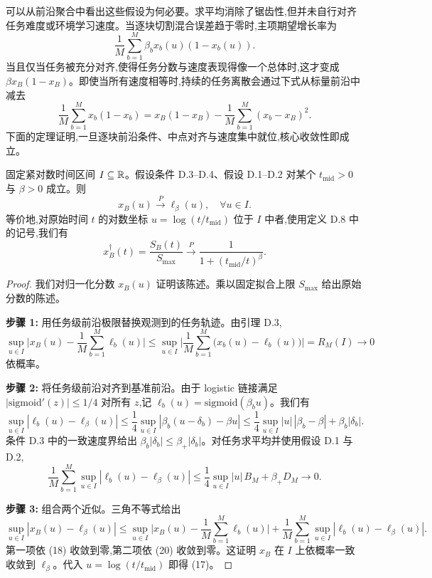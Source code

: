 可以从前沿聚合中看出这些假设为何必要。求平均消除了锯齿性,但并未自行对齐任务难度或环境学习速度。当逐块切割混合误差趋于零时,主项期望增长率为
\[
    \frac{1}{M} \sum_{b=1}^{M} \beta_{b} x_{b}(u)(1 - x_{b}(u)).
\]
当且仅当任务被充分对齐,使得任务分数与速度表现得像一个总体时,这才变成 $\beta x_{B} (1 - x_{B})$。即使当所有速度相等时,持续的任务离散会通过下式从标量前沿中减去
\[
    \frac{1}{M} \sum_{b=1}^{M} x_{b} (1 - x_{b}) = x_{B} (1 - x_{B}) - \frac{1}{M} \sum_{b=1}^{M} (x_{b} - x_{B})^{2}.
\]
下面的定理证明,一旦逐块前沿条件、中点对齐与速度集中就位,核心收敛性即成立。

\begin{theorem}
固定紧对数时间区间 $I \subseteq \mathbb{R}$。假设条件 D.3--D.4、假设 D.1--D.2 对某个 $t_{\mathrm{mid}} > 0$ 与 $\beta > 0$ 成立。则
\[
    x_{B}(u) \xrightarrow{P} \ell_{\beta}(u), \quad \forall u \in I.
\]
等价地,对原始时间 $t$ 的对数坐标 $u = \log(t / t_{\mathrm{mid}})$ 位于 $I$ 中者,使用定义 D.8 中的记号,我们有
\[
    x^{\dagger}_{B}(t) = \frac{S_{B}(t)}{S_{\max}} \xrightarrow{P} \frac{1}{1 + (t_{\mathrm{mid}} / t)^{\beta}}. \tag{17}
\]
\end{theorem}

\begin{proof}
我们对归一化分数 $x_{B}(u)$ 证明该陈述。乘以固定拟合上限 $S_{\max}$ 给出原始分数的陈述。

\textbf{步骤 1:} 用任务级前沿极限替换观测到的任务轨迹。由引理 D.3,
\[
    \sup_{u \in I} \biggl| x_{B}(u) - \frac{1}{M} \sum_{b=1}^{M} \ell_{b}(u) \biggr|
    \leq \sup_{u \in I} \biggl| \frac{1}{M} \sum_{b=1}^{M} \bigl( x_{b}(u) - \ell_{b}(u) \bigr) \biggr|
    = R_{M}(I) \to 0
\]
依概率。

\textbf{步骤 2:} 将任务级前沿对齐到基准前沿。由于 logistic 链接满足 $|\mathrm{sigmoid}'(z)| \leq 1/4$ 对所有 $z$,记 $\ell_{b}(u) = \mathrm{sigmoid}(\beta_{b} u)$。我们有
\[
    \sup_{u \in I} |\ell_{b}(u) - \ell_{\beta}(u)|
    \leq \frac{1}{4} \sup_{u \in I} |\beta_{b} (u - \delta_{b}) - \beta u|
    \leq \frac{1}{4} \sup_{u \in I} |u|\, |\beta_{b} - \beta| + \beta_{b} |\delta_{b}|.
\]
条件 D.3 中的一致速度界给出 $\beta_{b} |\delta_{b}| \leq \beta_{+} |\delta_{b}|$。对任务求平均并使用假设 D.1 与 D.2,
\[
    \frac{1}{M} \sum_{b=1}^{M} \sup_{u \in I} |\ell_{b}(u) - \ell_{\beta}(u)|
    \leq \frac{1}{4} \sup_{u \in I} |u|\, B_{M} + \beta_{+} D_{M} \to 0.
\]

\textbf{步骤 3:} 组合两个近似。三角不等式给出
\[
    \sup_{u \in I} |x_{B}(u) - \ell_{\beta}(u)|
    \leq \sup_{u \in I} \biggl| x_{B}(u) - \frac{1}{M} \sum_{b=1}^{M} \ell_{b}(u) \biggr|
    + \frac{1}{M} \sum_{b=1}^{M} \sup_{u \in I} |\ell_{b}(u) - \ell_{\beta}(u)|.
\]
第一项依 (18) 收敛到零,第二项依 (20) 收敛到零。这证明 $x_{B}$ 在 $I$ 上依概率一致收敛到 $\ell_{\beta}$。代入 $u = \log(t / t_{\mathrm{mid}})$ 即得 (17)。
\end{proof}

